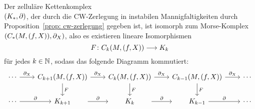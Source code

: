 \begin{theorem}
    \label{satz: morse-homologie ist zellulaere homologie}
    Der zelluläre Kettenkomplex \\ $(K_{\ast}, { \partial })$, der durch die CW-Zerlegung in instabilen 
    Mannigfaltigkeiten durch Proposition~\ref{prop: cw-zerlegung} gegeben ist, ist isomorph zum 
    Morse-Komplex $(C_{\ast}(M, (f, X)), { \partial }_X)$, also es existieren lineare Isomorphismen
    \[ F \colon C_k(M, (f, X)) \longrightarrow K_k \]
    für jedes $k \in { \mathbb N }$, sodass das folgende Diagramm kommutiert:
    \[ \begin{tikzcd}[column sep = 5ex]
        \cdots \arrow[r, "\del_X"] & 
            C_{k + 1}(M, (f, X)) \arrow[r, "\del_X"] \arrow[d, "F"] & 
            C_k(M, (f, X)) \arrow[r, "\del_X"] \arrow[d, "F"] &
            C_{k - 1}(M, (f, X)) \arrow[r, "\del_X"] \arrow[d, "F"] & \cdots \\
        \cdots \arrow[r, "\del"] & 
            K_{k + 1} \arrow[r, shorten <= 2em, shorten >= 2em, "\del"] & 
            K_k \arrow[r, shorten <= 2em, shorten >= 2em, "\del"] &
            K_{k - 1} \arrow[r, "\del"] & \cdots
    \end{tikzcd} \] 
\end{theorem}

